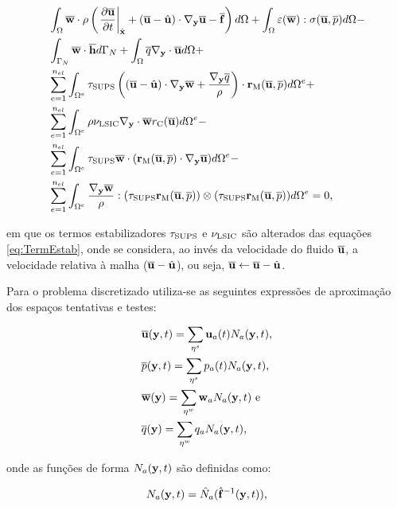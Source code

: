 \documentclass[_ArquivoPrincipal.tex]{subfiles}
\begin{document}
\begin{equation}
\begin{split}
    &\int_\Omega{\BBB{w}\cdot\rho\bigpar{\apderxh{\BBB{u}}{t}+(\BBB{u}-\uhat)\cdot\NN\BBB{u}-\BBB{f}}d\Omega}+\int_\Omega{\BB{\varepsilon}(\BBB{w}):\tens(\BBB{u},\bar{p})d\Omega}-\\
    &\int_{\Gamma_N}{\BBB{w}\cdot\BBB{h}d\Gamma_N}+\int_\Omega{\bar{q}\NN\cdot\BBB{u}d\Omega}+\\
    &\sum_{e=1}^{n_{el}}{\int_{\Omega^e}{\tau_\sups\bigpar{(\BBB{u}-\uhat)\cdot\NN\BBB{w}+\frac{\NN\bar{q}}{\rho}}\cdot\rM d\Omega^e}}+\\
    &\sum_{e=1}^{n_{el}}{\int_{\Omega^e}{\rho\nu_\lsic\NN\cdot\BBB{w}\rC d\Omega^e}}-\\
    &\sum_{e=1}^{n_{el}}{\int_{\Omega^e}{\tau_\sups\BBB{w}\cdot(\rM\cdot\NN\BBB{u})d\Omega^e}}-\\
    &\sum_{e=1}^{n_{el}}{\int_{\Omega^e}{
    \frac{\NN\BBB{w}}{\rho}:(\tau_\sups\rM)\otimes(\tau_\sups\rM)d\Omega^e}}=0
    \text{,}
    \label{eq:RBVMS-ALE}
\end{split}
\end{equation}

\noindent em que os termos estabilizadores $\tau_{\mathrm{SUPS}}$ e $\nu_{\mathrm{LSIC}}$ são alterados das equações \ref{eq:TermEstab}, onde se considera, ao invés da velocidade do fluido $\overline{\mathbf{u}}$, a velocidade relativa à malha ($\overline{\mathbf{u}}-\hat{\mathbf{u}}$), ou seja, $\overline{\mathbf{u}}\gets\overline{\mathbf{u}}-\hat{\mathbf{u}}$.

Para o problema discretizado utiliza-se as seguintes expressões de aproximação dos espaços tentativas e testes:

\begin{subequations}
    \begin{align}
        &\overline{\mathbf{u}}(\mathbf{y},t)=\sum_{\mathbf{\eta}^s}{\mathbf{u}_a(t)N_a(\mathbf{y},t)}\text{,}\\
        &\overline{p}(\mathbf{y},t)=\sum_{\mathbf{\eta}^s}{p_a(t)N_a(\mathbf{y},t)}\text{,}\\
        &\overline{\mathbf{w}}(\mathbf{y})=\sum_{\mathbf{\eta}^w}{\mathbf{w}_aN_a(\mathbf{y},t)}\text{ e}\\
        &\overline{q}(\mathbf{y})=\sum_{\mathbf{\eta}^w}{q_aN_a(\mathbf{y},t)}\text{,}
    \end{align}
\end{subequations}

\noindent onde as funções de forma $N_a(\mathbf{y},t)$ são definidas como:

\begin{equation}
    N_a(\mathbf{y},t)=\hat{N}_a(\hat{\mathbf{f}}^{-1}(\mathbf{y},t))\text{,}
\end{equation}
\end{document}
